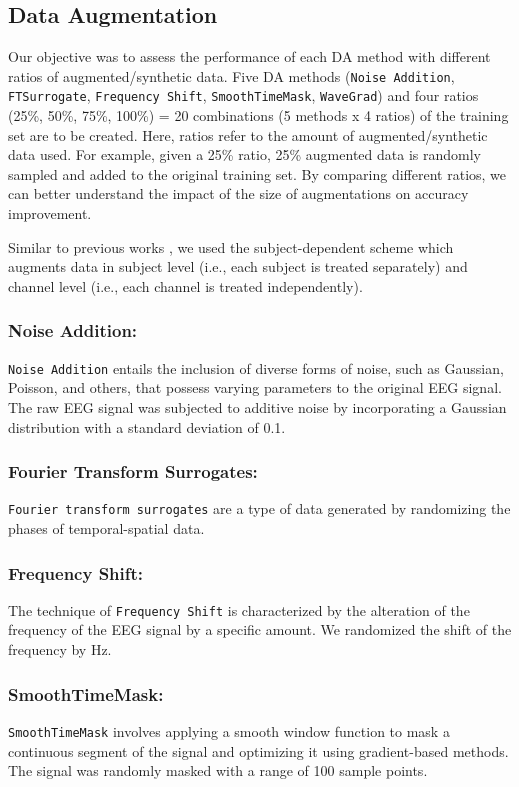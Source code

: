 \subsection{Data Augmentation}
Our objective was to assess the performance of each DA method with different ratios of augmented/synthetic data.
Five DA methods (\texttt{Noise Addition}, \texttt{FTSurrogate}, \texttt{Frequency Shift}, \texttt{SmoothTimeMask}, \texttt{WaveGrad}) and four ratios (25\%, 50\%, 75\%, 100\%) = 20 combinations (5 methods x 4 ratios) of the training set are to be created.
Here, ratios refer to the amount of augmented/synthetic data used.
For example, given a 25\% ratio, 25\% augmented data is randomly sampled and added to the original training set.
By comparing different ratios, we can better understand the impact of the size of augmentations on accuracy improvement.

Similar to previous works \cite{rommel2021cadda,mohsenvand2020contrastive,leeb2008bci,terzano2001atlas}, we used the subject-dependent scheme which augments data in subject level (i.e., each subject is treated separately) and channel level (i.e., each channel is treated independently).


\subsubsection{Noise Addition:}
\texttt{Noise Addition} entails the inclusion of diverse forms of noise, such as Gaussian, Poisson, and others, that possess varying parameters to the original EEG signal. 
The raw EEG signal was subjected to additive noise by incorporating a Gaussian distribution with a standard deviation of 0.1. 

\subsubsection{Fourier Transform Surrogates:}
\texttt{Fourier transform surrogates} are a type of data generated by randomizing the phases of temporal-spatial data.


\subsubsection{Frequency Shift:} The technique of \texttt{Frequency Shift} is characterized by the alteration of the frequency of the EEG signal by a specific amount.
We randomized the shift of the frequency by  Hz.

\subsubsection{SmoothTimeMask:}
\texttt{SmoothTimeMask} involves applying a smooth window function to mask a continuous segment of the signal and optimizing it using gradient-based methods.
The signal was randomly masked with a range of 100 sample points.

